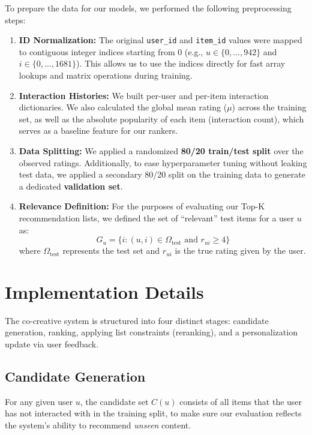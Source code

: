 \documentclass[11pt]{article}
\begin{document}
\noindent To prepare the data for our models, we performed the following preprocessing steps:
\begin{enumerate}
    \item \textbf{ID Normalization:} The original \texttt{user\_id} and \texttt{item\_id} values were mapped to contiguous integer indices starting from 0 (e.g., $u \in \{0, \dots, 942\}$ and $i \in \{0, \dots, 1681\}$). This allows us to use the indices directly for fast array lookups and matrix operations during training.
    \item \textbf{Interaction Histories:} We built per-user and per-item interaction dictionaries. We also calculated the global mean rating ($\mu$) across the training set, as well as the absolute popularity of each item (interaction count), which serves as a baseline feature for our rankers.
    \item \textbf{Data Splitting:} We applied a randomized \textbf{80/20 train/test split} over the observed ratings. Additionally, to ease hyperparameter tuning without leaking test data, we applied a secondary 80/20 split on the training data to generate a dedicated \textbf{validation set}.
    \item \textbf{Relevance Definition:} For the purposes of evaluating our Top-K recommendation lists, we defined the set of ``relevant'' test items for a user $u$ as:
    $$G_u = \{i : (u,i) \in \Omega_{\text{test}} \text{ and } r_{ui} \ge 4\}$$
    where $\Omega_{\text{test}}$ represents the test set and $r_{ui}$ is the true rating given by the user.
\end{enumerate}

\section{Implementation Details}
\label{sec:implementation}

\noindent The co-creative system is structured into four distinct stages: candidate generation, ranking, applying list constraints (reranking), and a personalization update via user feedback.

\subsection{Candidate Generation}

\noindent For any given user $u$, the candidate set $C(u)$ consists of all items that the user has not interacted with in the training split, to make sure our evaluation reflects the system's ability to recommend \textit{unseen} content.
\end{document}
